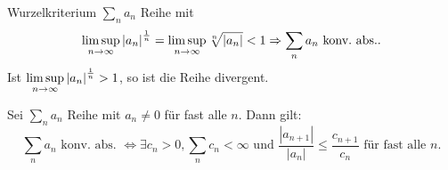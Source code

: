 \documentclass[main.tex]{subfiles}
\begin{document}
\begin{karte}{Wurzelkriterium}
    \( \sum_{n}a_n \) Reihe mit 
    \[ \limsup\limits_{n\rightarrow\infty} 
    \left| a_n \right|^{\frac{1}{n}} 
    = \limsup\limits_{n\rightarrow\infty} 
    \sqrt[n]{\left| a_n \right|} < 1 
    \Rightarrow \sum_n a_n 
    \text{ konv.\ abs.}.\]
    Ist \( \limsup\limits_{n\rightarrow\infty} 
    \left| a_n \right|^{\frac{1}{n}} > 1 \), 
    so ist die Reihe divergent.
\end{karte}
\begin{karte}{}
    Sei \( \sum_n a_n \) Reihe mit 
    \(a_n \neq 0 \) für fast alle \(n\). 
    Dann gilt:
    \[ \sum_n a_n \text{ konv.\ abs.\ } 
    \Leftrightarrow \exists c_n > 0, 
    \sum_n c_n < \infty \text{ und } 
    \frac{|a_{n+1}|}{|a_n|} \leq 
    \frac{c_{n+1}}{c_n} 
    \text{ für fast alle }n. \]
\end{karte}
\end{document}
